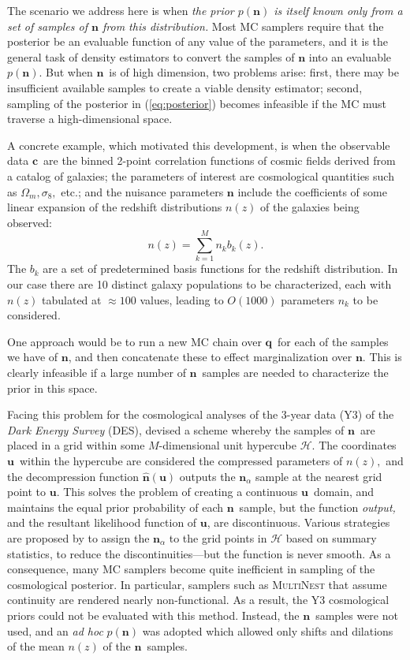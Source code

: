 \documentclass[linenumbers, onecolumn]{aastex63}
\newcommand{\vecc}{\ensuremath{\mathbf{c}}}
\newcommand{\vecq}{\ensuremath{\mathbf{q}}}
\newcommand{\vecn}{\ensuremath{\mathbf{n}}}
\newcommand{\vecu}{\ensuremath{\mathbf{u}}}
\begin{document}
The scenario we address here is when \emph{the prior $p(\vecn)$ is itself known only from a set of samples of $\vecn$ from this distribution.} Most MC samplers require that the posterior be an evaluable function of any value of the parameters, and it is the general task of density estimators to convert the samples of $\vecn$ into an evaluable $p(\vecn).$  But when \vecn\ is of high dimension, two problems arise: first, there may be insufficient available samples to create a viable density estimator; second, sampling of the posterior in (\ref{eq:posterior}) becomes infeasible if the MC must traverse a high-dimensional space.

A concrete example, which motivated this development,
is when the observable data \vecc\ are the binned 2-point correlation functions of
cosmic fields derived from a catalog of galaxies; the parameters of
interest are cosmological quantities such as $\Omega_m, \sigma_8,$
etc.; and the nuisance parameters $\vecn$
include the coefficients of some linear expansion of the redshift distributions $n(z)$ of the galaxies being observed:
\begin{equation}
  n(z) = \sum_{k=1}^{M} n_k b_k(z).
  \label{eq:nzbasis}
\end{equation}
The $b_k$ are a set of predetermined basis functions for the redshift
distribution.  In our case there are 10 distinct galaxy populations to
be characterized, each with $n(z)$ tabulated at $\approx100$ values, leading to $O(1000)$ parameters $n_k$ to be considered.

One approach would be to run a new MC chain over \vecq\ for each of the samples we have of \vecn, and then concatenate these to effect marginalization over \vecn.  This is clearly infeasible if a large number of \vecn\ samples are needed to characterize the prior in this space.

Facing this problem for the cosmological analyses of the 3-year data (Y3)
of the \textit{Dark Energy Survey} (DES),
\citet{hyperrank} devised a scheme whereby
the samples of \vecn\ are placed in a grid within some $M$-dimensional
unit hypercube $\mathcal{H}$.  The coordinates \vecu\ within the hypercube
are considered the compressed parameters of $n(z),$ and the
decompression function
$\hat{\vecn}(\vecu)$ outputs the $\vecn_\alpha$ sample at the nearest grid point to
  \vecu.  This solves the problem of creating a continuous \vecu\
  domain, and maintains the equal prior probability of each \vecn\
  sample, but the function \emph{output,} and the resultant likelihood
  function of \vecu, are discontinuous.
Various strategies are proposed by \citet{hyperrank} to assign the $\vecn_\alpha$ to the grid points in
$\mathcal{H}$ based on summary statistics, to reduce the
discontinuities---but the function is never smooth.
As a consequence, many MC samplers become quite inefficient in
sampling of the cosmological posterior.  In particular, samplers such as \textsc{MultiNest} that assume continuity are rendered nearly non-functional.  As a result, the Y3 cosmological priors could not be evaluated with this method.  Instead, the \vecn\ samples were not used, and an \textit{ad hoc} $p(\vecn)$ was adopted which allowed only shifts and dilations of the mean $n(z)$ of the \vecn\ samples.
\end{document}
